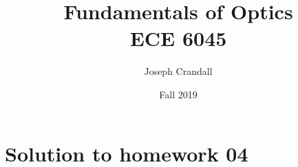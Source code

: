 

\usepackage{subfiles}
\usepackage{color,soul}
\usepackage{siunitx}
\usepackage{gensymb}

\title{Fundamentals of Optics\\
\large ECE 6045}
\author{Joseph Crandall}
\date{Fall 2019}


\maketitle

%

%

%

\section{Solution to homework 04}


%

%


